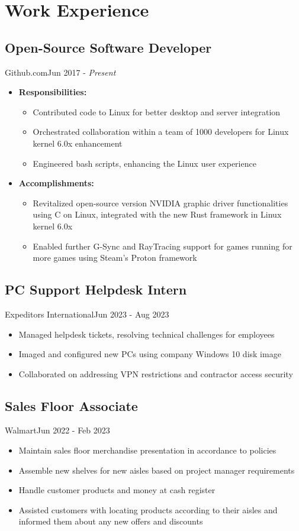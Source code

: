 \section{Work Experience}
\subsection{Open-Source Software Developer}{Github.com}{Jun 2017 - \textit{Present}}
\begin{itemize}
    \item \textbf{Responsibilities:}
  \begin{itemize}
  \item Contributed code to Linux for better desktop and server integration
  \item Orchestrated collaboration within a team of 1000 developers for Linux kernel 6.0x enhancement
  \item Engineered bash scripts, enhancing the Linux user experience
  \end{itemize}
  \item{\textbf{Accomplishments:}}
  \begin{itemize}
  \item Revitalized open-source version NVIDIA graphic driver functionalities using C on Linux, integrated with the new Rust framework in Linux kernel 6.0x
  \item Enabled further G-Sync and RayTracing support for games running for more games using Steam's Proton framework
  \end{itemize}
\end{itemize}
\subsection{PC Support Helpdesk Intern}{Expeditors International}{Jun 2023 - Aug 2023}
\begin{itemize}
    \item Managed helpdesk tickets, resolving technical challenges for employees
    \item Imaged and configured new PCs using company Windows 10 disk image
    \item Collaborated on addressing VPN restrictions and contractor access security
\end{itemize}
\subsection{Sales Floor Associate}{Walmart}{Jun 2022 - Feb 2023}
\begin{itemize}
    \item Maintain sales floor merchandise presentation in accordance to policies
    \item Assemble new shelves for new aisles based on project manager requirements
    \item Handle customer products and money at cash register
    \item Assisted customers with locating products according to their aisles and informed them about any new offers and discounts 
\end{itemize}
